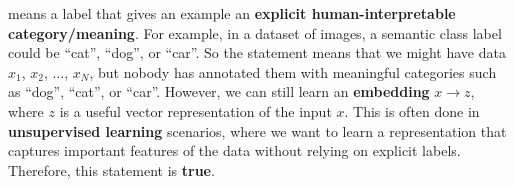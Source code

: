 \begin{itemize}
         means a label that gives an example an \textbf{explicit human-interpretable category/meaning}. For example, in a dataset of images, a semantic class label could be ``cat'', ``dog'', or ``car''. So the statement means that we might have data $x_1$, $x_2$, $\dots$, $x_{N}$, but nobody has annotated them with meaningful categories such as ``dog'', ``cat'', or ``car''. However, we can still learn an \textbf{embedding} $x \to z$, where $z$ is a useful vector representation of the input $x$. This is often done in \textbf{unsupervised learning} scenarios, where we want to learn a representation that captures important features of the data without relying on explicit labels. Therefore, this statement is \textbf{true}.
\end{itemize}

\newpage

